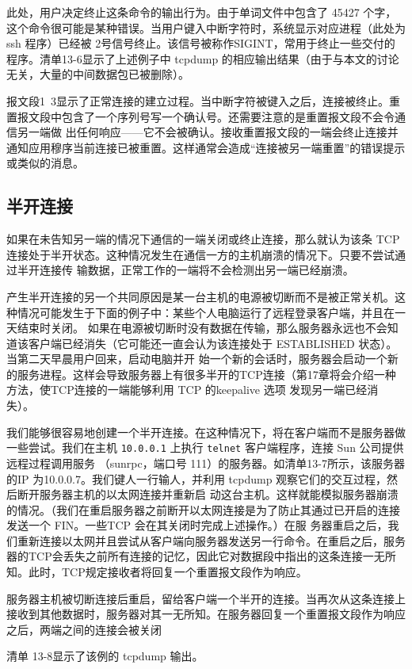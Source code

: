 此处，用户决定终止这条命令的输出行为。由于单词文件中包含了 45427
个字，这个命令很可能是某种错误。当用户键入中断字符时，系统显示对应进程（此处为 ssh 程序）已经被
2号信号终止。该信号被称作SIGINT，常用于终止一些交付的程序。清单13-6显示了上述例子中 tcpdump
的相应输出结果（由于与本文的讨论无关，大量的中间数据包已被删除）。

报文段1~3显示了正常连接的建立过程。当中断字符被键入之后，连接被终止。重置报文段中包含了一个序列号写一个确认号。还需要注意的是重置报文段不会令通信另一端做
出任何响应——它不会被确认。接收重置报文段的一端会终止连接并通知应用穆序当前连接已被重置。这样通常会造成“连接被另一端重置”的错误提示或类似的消息。
\subsection{半开连接}
如果在未告知另一端的情况下通信的一端关闭或终止连接，那么就认为该条 TCP 连接处于半开状态。这种情况发生在通信一方的主机崩溃的情况下。只要不尝试通过半开连接传
输数据，正常工作的一端将不会检测出另一端已经崩溃。

产生半开连接的另一个共同原因是某一台主机的电源被切断而不是被正常关机。这种情况可能发生于下面的例子中：某些个人电脑运行了远程登录客户端，并且在一天结束时关闭。
如果在电源被切断时没有数据在传输，那么服务器永远也不会知道该客户端已经消失（它可能还一直会认为该连接处于 ESTABLISHED
状态）。当第二天早晨用户回来，启动电脑并开
始一个新的会话时，服务器会启动一个新的服务进程。这样会导致服务器上有很多半开的TCP连接（第17章将会介绍一种方法，使TCP连接的一端能够利用
TCP 的keepalive 选项
发现另一端已经消失）。

我们能够很容易地创建一个半开连接。在这种情况下，将在客户端而不是服务器做一些尝试。我们在主机 \verb|10.0.0.1| 上执行
\verb|telnet| 客户端程序，连接 Sun 公司提供远程过程调用服务
（sunrpc，端口号 111）的服务器。如清单13-7所示，该服务器的IP 为10.0.0.7。我们键人一行输人，并利用 tcpdump
观察它们的交互过程，然后断开服务器主机的以太网连接并重新启
动这台主机。这样就能模拟服务器崩溃的情况。（我们在重启服务器之前断开以太网连接是为了防止其通过已开启的连接发送一个 FIN。一些TCP
会在其关闭时完成上述操作。）在服
务器重启之后，我们重新连接以太网并且尝试从客户端向服务器发送另一行命令。在重启之后，服务器的TCP会丢失之前所有连接的记忆，因此它对数据段中指出的这条连接一无所
知。此时，TCP规定接收者将回复一个重置报文段作为响应。

服务器主机被切断连接后重启，留给客户端一个半开的连接。当再次从这条连接上接收到其他数据时，服务器对其一无所知。在服务器回复一个重置报文段作为响应之后，两端之间的连接会被关闭

清单 13-8显示了该例的 tcpdump 输出。


